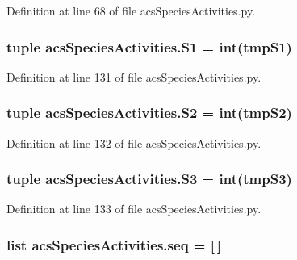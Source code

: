 Definition at line 68 of file acs\-Species\-Activities.\-py.

\hypertarget{a00103_a4ffac9566fa24baa2b27ccd97f9ffe1e}{
\subsubsection[{S1}]{\setlength{\rightskip}{0pt plus 5cm}tuple acs\-Species\-Activities.\-S1 = int(tmp\-S1)}}\label{a00103_a4ffac9566fa24baa2b27ccd97f9ffe1e}


Definition at line 131 of file acs\-Species\-Activities.\-py.

\hypertarget{a00103_a3b95f66d848ccbac2740be2878b2499b}{
\subsubsection[{S2}]{\setlength{\rightskip}{0pt plus 5cm}tuple acs\-Species\-Activities.\-S2 = int(tmp\-S2)}}\label{a00103_a3b95f66d848ccbac2740be2878b2499b}


Definition at line 132 of file acs\-Species\-Activities.\-py.

\hypertarget{a00103_a654d2a657cf4b354b3791a8b2de3d74e}{
\subsubsection[{S3}]{\setlength{\rightskip}{0pt plus 5cm}tuple acs\-Species\-Activities.\-S3 = int(tmp\-S3)}}\label{a00103_a654d2a657cf4b354b3791a8b2de3d74e}


Definition at line 133 of file acs\-Species\-Activities.\-py.

\hypertarget{a00103_a50a8f7f4bae0fd037961d91206f5178c}{
\subsubsection[{seq}]{\setlength{\rightskip}{0pt plus 5cm}list acs\-Species\-Activities.\-seq = \mbox{[}$\,$\mbox{]}}}\label{a00103_a50a8f7f4bae0fd037961d91206f5178c}



